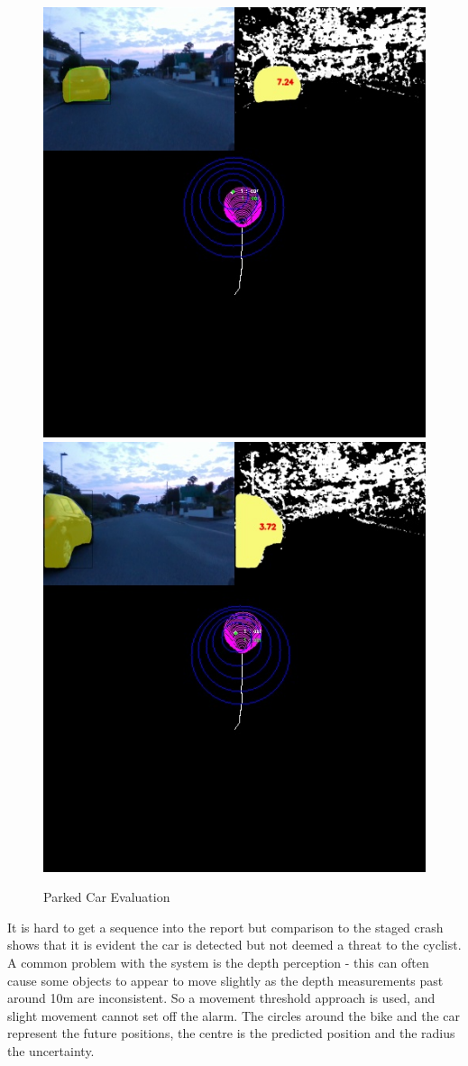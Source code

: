 \documentclass[11pt,twoside]{report}
\begin{document}
\noindent \begin{figure}[h!]
	\includegraphics[width = 0.5\hsize,trim={0 8cm 0 0},clip]{figures/parked_seq_1.jpg}
	\includegraphics[width = 0.5\hsize,trim={0 8cm 0 0},clip]{figures/parked_seq_2.jpg}
	\caption{Parked Car Evaluation}
	\label{parked_car_seq}
\end{figure}

It is hard to get a sequence into the report but comparison to the staged crash shows that it is evident the car is detected but not deemed a threat to the cyclist. A common problem with the system is the depth perception - this can often cause some objects to appear to move slightly as the depth measurements past around 10m are inconsistent. So a movement threshold approach is used, and slight movement cannot set off the alarm. The circles around the bike and the car represent the future positions, the centre is the predicted position and the radius the uncertainty. 
\end{document}
